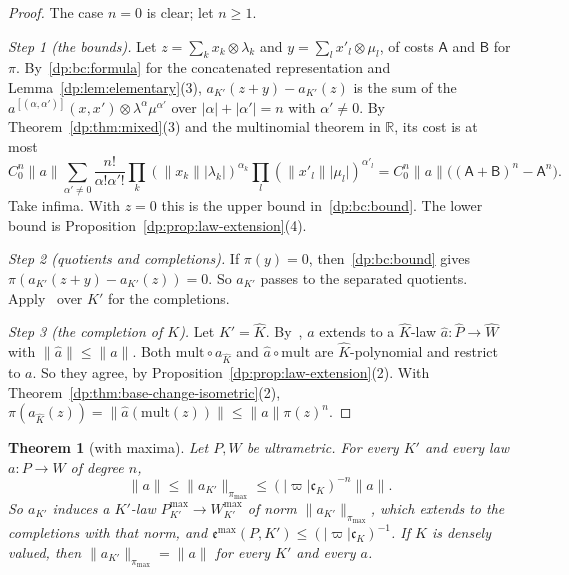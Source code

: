 \documentclass[11pt]{amsart}
\newtheorem{theorem}{Theorem}[section]
\theoremstyle{definition}
\theoremstyle{remark}
\numberwithin{equation}{section}
\newcommand{\abs}[1]{\lvert #1\rvert}
\newcommand{\norm}[1]{\lVert #1\rVert}
\newcommand{\Kh}{\widehat K}
\theoremstyle{plain}
\theoremstyle{definition}
\theoremstyle{plain}
\begin{document}
\begin{proof}
The case $n=0$ is clear; let $n\ge1$.

\emph{Step 1 (the bounds).} Let $z=\sum_kx_k\otimes\lambda_k$ and $y=\sum_lx'_l\otimes\mu_l$, of costs $\mathsf A$ and $\mathsf B$ for $\pi$. By~\eqref{dp:bc:formula} for the concatenated representation and Lemma~\ref{dp:lem:elementary}(3), $a_{K'}(z+y)-a_{K'}(z)$ is the sum of the $a^{[(\alpha,\alpha')]}(x,x')\otimes\lambda^\alpha\mu^{\alpha'}$ over $\abs\alpha+\abs{\alpha'}=n$ with $\alpha'\ne0$. By Theorem~\ref{dp:thm:mixed}(3) and the multinomial theorem in $\mathbb R$, its cost is at most
\[
 C_0^n\norm a\sum_{\alpha'\ne0}\frac{n!}{\alpha!\alpha'!}\prod_k(\norm{x_k}\abs{\lambda_k})^{\alpha_k}\prod_l(\norm{x'_l}\abs{\mu_l})^{\alpha'_l}=C_0^n\norm a\bigl((\mathsf A+\mathsf B)^n-\mathsf A^n\bigr).
\]
Take infima. With $z=0$ this is the upper bound in~\eqref{dp:bc:bound}. The lower bound is Proposition~\ref{dp:prop:law-extension}(4).

\emph{Step 2 (quotients and completions).} If $\pi(y)=0$, then~\eqref{dp:bc:bound} gives $\pi(a_{K'}(z+y)-a_{K'}(z))=0$. So $a_{K'}$ passes to the separated quotients. Apply~\cite[Lemma~Q.13(1)]{I} over $K'$ for the completions.

\emph{Step 3 (the completion of $K$).} Let $K'=\Kh$. By~\cite[Lemma~Q.13(1)]{I}, $a$ extends to a $\Kh$-law $\hat a\colon\widehat P\to\widehat W$ with $\norm{\hat a}\le\norm a$. Both $\mathrm{mult}\circ a_{\Kh}$ and $\hat a\circ\mathrm{mult}$ are $\Kh$-polynomial and restrict to $a$. So they agree, by Proposition~\ref{dp:prop:law-extension}(2). With Theorem~\ref{dp:thm:base-change-isometric}(2), $\pi(a_{\Kh}(z))=\norm{\hat a(\mathrm{mult}(z))}\le\norm a\pi(z)^n$.
\end{proof}

\begin{theorem}[with maxima]\label{dp:thm:base-change-um}
Let $P,W$ be ultrametric. For every $K'$ and every law $a\colon P\to W$ of degree $n$,
\[
 \norm a\le\norm{a_{K'}}_{\pi_{\max}}\le(\abs\varpi\mathfrak c_K)^{-n}\norm a.
\]
So $a_{K'}$ induces a $K'$-law $P^{\max}_{K'}\to W^{\max}_{K'}$ of norm $\norm{a_{K'}}_{\pi_{\max}}$, which extends to the completions with that norm, and $\mathfrak e^{\max}(P,K')\le(\abs\varpi\mathfrak c_K)^{-1}$. If $K$ is densely valued, then $\norm{a_{K'}}_{\pi_{\max}}=\norm a$ for every $K'$ and every $a$.
\end{theorem}
\end{document}
